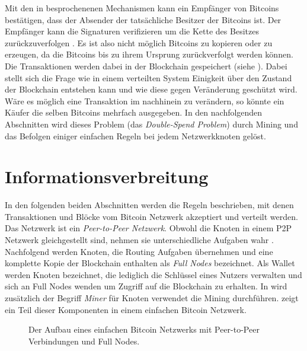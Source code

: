 \documentclass[ngerman,runningheads,a4paper]{llncs}[2018/03/10]
\begin{document}
Mit den in  besprochenenen Mechanismen kann ein Empfänger von Bitcoins bestätigen, dass der Absender der tatsächliche Besitzer der Bitcoins ist. Der Empfänger kann die Signaturen verifizieren um die Kette des Besitzes zurückzuverfolgen \citep{bitcoinPDF}. Es ist also nicht möglich Bitcoins zu kopieren oder zu erzeugen, da die Bitcoins bis zu ihrem Ursprung zurückverfolgt werden können. Die Transaktionen werden dabei in der Blockchain gespeichert (siehe ). Dabei stellt sich die Frage wie in einem verteilten System Einigkeit über den Zustand der Blockchain entstehen kann und wie diese gegen Veränderung geschützt wird. Wäre es möglich eine Transaktion im nachhinein zu verändern, so könnte ein Käufer die selben Bitcoins mehrfach ausgegeben. In den nachfolgenden Abschnitten wird dieses Problem (das \textit{Double-Spend Problem}) durch Mining und das Befolgen einiger einfachen Regeln bei jedem Netzwerkknoten gelöst.


\section{Informationsverbreitung}\label{sec:informationsverbreitung}

In den folgenden beiden Abschnitten werden die Regeln beschrieben, mit denen Transaktionen und Blöcke vom Bitcoin Netzwerk akzeptiert und verteilt werden. Das Netzwerk ist ein \textit{Peer-to-Peer Netzwerk}. Obwohl die Knoten in einem P2P Netzwerk gleichgestellt sind, nehmen sie unterschiedliche Aufgaben wahr \citep{bitcoinbook}. Nachfolgend werden Knoten, die Routing Aufgaben übernehmen und eine komplette Kopie der Blockchain enthalten als \textit{Full Nodes} bezeichnet. Als Wallet werden Knoten bezeichnet, die lediglich die Schlüssel eines Nutzers verwalten und sich an Full Nodes wenden um Zugriff auf die Blockchain zu erhalten. In  wird zusätzlich der Begriff \textit{Miner} für Knoten verwendet die Mining durchführen.  zeigt ein Teil dieser Komponenten in einem einfachen Bitcoin Netzwerk. 

\begin{figure}
  \centering
  \caption{Der Aufbau eines einfachen Bitcoin Netzwerks mit Peer-to-Peer Verbindungen und Full Nodes.}
  \label{fig:basicNetwork}
\end{figure}
\end{document}
